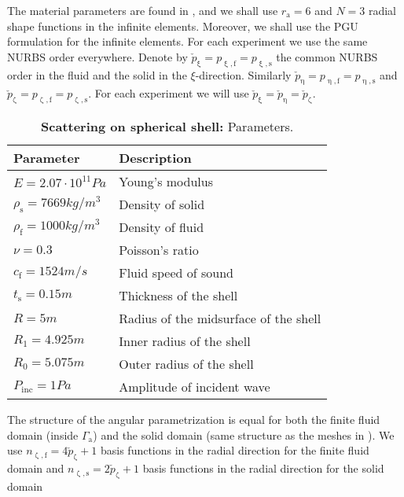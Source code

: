 The material parameters are found in , and we shall use $r_{\mathrm{a}}=6$ and $N=3$ radial shape functions in the infinite elements. Moreover, we shall use the PGU formulation for the infinite elements. For each experiment we use the same NURBS order everywhere. Denote by $\check{p}_\upxi = p_{\upxi,\mathrm{f}} = p_{\upxi,\mathrm{s}}$ the common NURBS order in the fluid and the solid in the $\xi$-direction. Similarly $\check{p}_\upeta = p_{\upeta,\mathrm{f}} = p_{\upeta,\mathrm{s}}$ and $\check{p}_\upzeta = p_{\upzeta,\mathrm{f}} = p_{\upzeta,\mathrm{s}}$. For each experiment we will use $\check{p}_\upxi = \check{p}_\upeta = \check{p}_\upzeta$.

\begin{table}
	\centering
	\caption[Parameters for spherical shell]{\textbf{Scattering on spherical shell:} Parameters.}
	\label{Tab2:sphericalShellParameters}
	\begin{tabular}{l l}
		\toprule
		Parameter & Description\\
		\midrule
		$E = 2.07\cdot 10^{11}\unit{Pa}$ & Young's modulus\\
		$\rho_{\mathrm{s}} = 7669\unit{kg/m^3}$ & Density of solid\\
		$\rho_{\mathrm{f}} = 1000\unit{kg/m^3}$ & Density of fluid\\
		$\nu = 0.3$ & Poisson's ratio\\
		$c_{\mathrm{f}} = 1524\unit{m/s}$ & Fluid speed of sound\\
		$t_{\mathrm{s}} = 0.15\unit{m}$ & Thickness of the shell\\
		$R = 5\unit{m}$ & Radius of the midsurface of the shell\\
		$R_1 = 4.925\unit{m}$ & Inner radius of the shell\\
		$R_0 = 5.075\unit{m}$ & Outer radius of the shell\\
		$P_{\mathrm{inc}} = 1\unit{Pa}$ & Amplitude of incident wave\\
		\bottomrule
	\end{tabular}
\end{table}
The structure of the angular parametrization is equal for both the finite fluid domain (inside $\Gamma_{\mathrm{a}}$) and the solid domain (same structure as the meshes in ). We use $n_{\upzeta, \mathrm{f}}=4\check{p}_\upzeta+1$ basis functions in the radial direction for the finite fluid domain and $n_{\upzeta, \mathrm{s}}=2\check{p}_\upzeta+1$ basis functions in the radial direction for the solid domain

